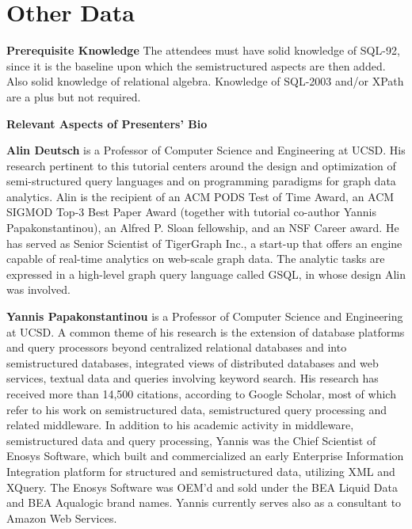 

\section{Other Data}
\label{sec:duration}

\noindent \textbf{Prerequisite Knowledge} 
\label{sec:audience}
The attendees must have solid knowledge of SQL-92, since it is the baseline upon which the semistructured aspects are then added. Also solid knowledge of relational algebra. Knowledge of SQL-2003 and/or XPath are a plus but not required.

\smallskip
\noindent \textbf{Relevant Aspects of Presenters' Bio} 

\textbf{Alin Deutsch} is a Professor of Computer Science and Engineering at UCSD. His research pertinent to this tutorial centers around the design and optimization of semi-structured query languages
and on programming paradigms for graph data analytics. Alin is the recipient of an ACM PODS Test of Time Award, an ACM SIGMOD Top-3 Best Paper Award (together with tutorial co-author Yannis Papakonstantinou), an Alfred P. Sloan fellowship, and an NSF Career award.
He has served as Senior Scientist of TigerGraph Inc., a start-up that offers an engine capable of real-time analytics on web-scale graph data.
The analytic tasks are  expressed in a high-level graph query language called GSQL, in whose design Alin was involved.

\textbf{Yannis Papakonstantinou} is a Professor of Computer Science and Engineering at UCSD. A common theme of his research is the extension of database platforms and query processors beyond centralized relational databases and into semistructured databases, integrated views of distributed databases and web services, textual data and queries involving keyword search. His research has received more than 14,500 citations, according to Google Scholar, most of which refer to his work on semistructured data, semistructured query processing and related middleware.
In addition to his academic activity in middleware, semistructured data and query processing, Yannis was the Chief Scientist of Enosys Software, which built and commercialized an early Enterprise Information Integration platform for structured and semistructured data, utilizing XML and XQuery. The Enosys Software was OEM'd and sold under the BEA Liquid Data and BEA Aqualogic brand names. Yannis currently serves also as a consultant to Amazon Web Services.

